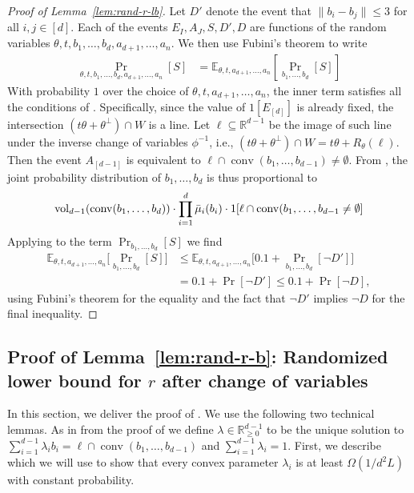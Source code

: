 \documentclass{article}\usepackage[a4paper,margin=20mm]{geometry}
\newcommand{\R}{\mathbb R}
\newcommand{\E}{\mathbb E}
\newcommand{\conv}{\operatorname{conv}}
\newcommand{\vol}{\operatorname{vol}}
\renewcommand{\subset}{\subseteq}
\begin{document}
\begin{proof}[Proof of Lemma~\ref{lem:rand-r-lb}]
Let $D'$ denote the event that $\|b_i - b_j\| \leq 3$ for all $i,j \in [d]$.
Each of the events $E_I, A_J, S, D', D$ are functions of
the random variables $\theta, t, b_1,\dots,b_d,a_{d+1},\dots,a_n$.
We then use Fubini's theorem to write
\begin{align*}
    \Pr_{\theta,t,b_1,\dots,b_d,a_{d+1},\dots,a_n}[S]
    &= \E_{\theta,t,a_{d+1},\dots,a_n}[\Pr_{b_1,\dots,b_d}[S]]
\end{align*}
With probability $1$ over the choice of $\theta,t,a_{d+1},\dots,a_n$,
the inner term satisfies all the conditions of .
Specifically, since
the value of $1[E_{[d]}]$ is already fixed, the intersection
$(t\theta + \theta^\perp) \cap W$ is a line.
Let $\ell \subset \R^{d-1}$ be the image of such line under the inverse change of variables $\phi^{-1}$, i.e., $(t\theta + \theta^\perp) \cap W = t\theta + R_{\theta}(\ell)$.
Then the event $A_{[d-1]}$ is equivalent to $\ell \cap \conv(b_1,\dots,b_{d-1}) \neq \emptyset$.
From ,
the joint probability distribution of $b_1,\dots,b_d$ is thus proportional to
    \begin{align*}
        \vol_{d-1}(\conv(b_1, \ldots, b_d)) \cdot \prod_{i=1}^d \Bar{\mu}_i(b_i) \cdot 1[\ell \cap \conv(b_1,\dots,b_{d-1} \neq \emptyset]
    \end{align*}
Applying  to the term $\Pr_{b_1,\dots,b_d}[S]$ we find
\begin{align*}
    \E_{\theta,t,a_{d+1},\dots,a_n}\big[\Pr_{b_1,\dots,b_d}[S] \big]
    &\leq \E_{\theta,t,a_{d+1},\dots,a_n}\big[0.1 + \Pr_{b_1,\dots,b_d}[\neg D'] \big]\\
    &= 0.1 + \Pr[\neg D'] \leq 0.1 + \Pr[\neg D],
\end{align*}
using Fubini's theorem for the equality and the fact that $\neg D'$ implies $\neg D$
for the final inequality.
\end{proof}


\subsection{Proof of Lemma~\ref{lem:rand-r-b}: Randomized lower bound for $r$ after change of variables}\label{sec:pf-rand-r-b} 

In this section, we deliver the proof of . We use the following two technical lemmas.
As in from the proof of  we define $\lambda \in \R^{d-1}_{\geq 0}$ to be the unique solution to $\sum_{i=1}^{d-1} \lambda_i b_i = \ell \cap \conv(b_1, \ldots, b_{d-1})$ and $\sum_{i=1}^{d-1} \lambda_i = 1$.
First, we describe  which we will use to show that every convex parameter $\lambda_i$ is at least $\Omega(1/d^2L)$ with constant probability.
\end{document}
